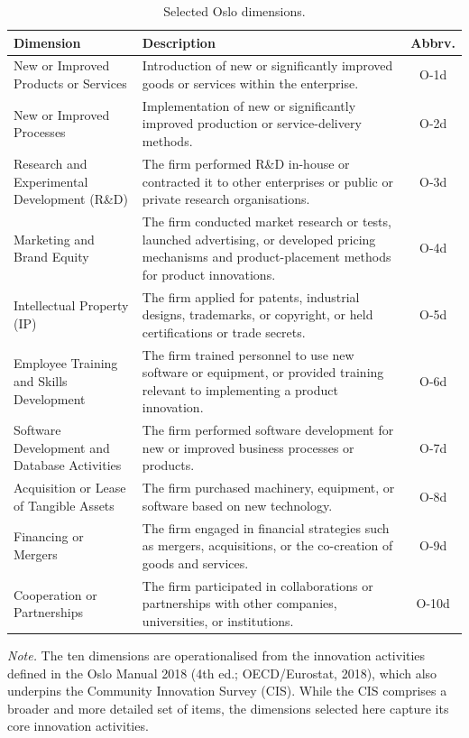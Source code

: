\documentclass[runningheads]{llncs}
\begin{document}
\begin{table}[ht]
\centering
\renewcommand{\arraystretch}{1.2}
\caption{Selected Oslo dimensions.}
\label{tab:oslo}
\begin{tabular}{|p{3cm}|p{9cm}|c|}
\hline
\textbf{Dimension} & \textbf{Description} & \textbf{Abbrv.} \\
\hline
New or Improved Products or Services & Introduction of new or significantly improved goods or services within the enterprise. & O-1d \\
\hline
New or Improved Processes & Implementation of new or significantly improved production or service-delivery methods. & O-2d \\
\hline
Research and Experimental Development (R\&D) & The firm performed R\&D in-house or contracted it to other enterprises or public or private research organisations. & O-3d \\
\hline
Marketing and Brand Equity & The firm conducted market research or tests, launched advertising, or developed pricing mechanisms and product-placement methods for product innovations. & O-4d \\
\hline
Intellectual Property (IP) & The firm applied for patents, industrial designs, trademarks, or copyright, or held certifications or trade secrets. & O-5d \\
\hline
Employee Training and Skills Development & The firm trained personnel to use new software or equipment, or provided training relevant to implementing a product innovation. & O-6d \\
\hline
Software Development and Database Activities & The firm performed software development for new or improved business processes or products. & O-7d \\
\hline
Acquisition or Lease of Tangible Assets & The firm purchased machinery, equipment, or software based on new technology. & O-8d \\
\hline
Financing or Mergers & The firm engaged in financial strategies such as mergers, acquisitions, or the co-creation of goods and services. & O-9d \\
\hline
Cooperation or Partnerships & The firm participated in collaborations or partnerships with other companies, universities, or institutions. & O-10d \\
\hline
\end{tabular}

\par\vspace{4pt}
\parbox{13cm}{\footnotesize \textit{Note.} The ten dimensions are operationalised from the
innovation activities defined in the Oslo Manual 2018 (4th ed.; OECD/Eurostat, 2018), which
also underpins the Community Innovation Survey (CIS). While the CIS comprises a broader and
more detailed set of items, the dimensions selected here capture its core innovation activities.}
\end{table}
\end{document}
